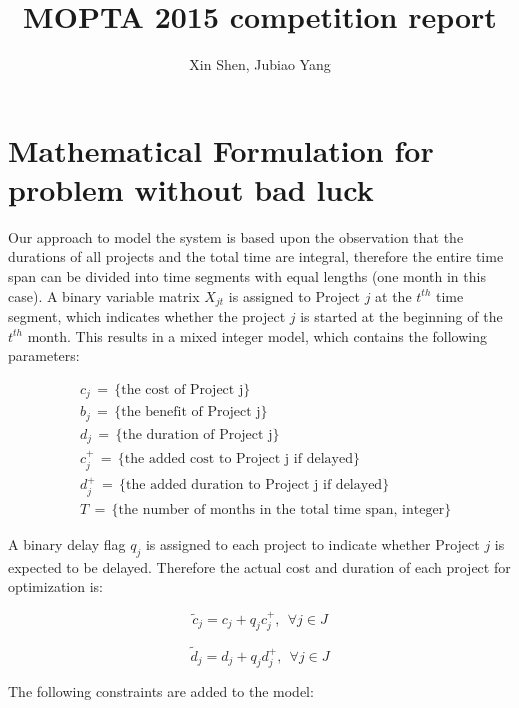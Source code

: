 \documentclass[final,3p,times]{elsarticle}
\begin{document}
\begin{frontmatter}

\title{MOPTA 2015 competition report}

\author{Xin Shen, Jubiao Yang}
\end{frontmatter}

\section{Mathematical Formulation for problem without bad luck}
Our approach to model the system is based upon the observation that the durations of all projects and the total time are integral, therefore the entire time span can be divided into time segments with equal lengths (one month in this case). A binary variable matrix $X_{jt}$ is assigned to Project $j$ at the $t^{th}$ time segment, which indicates whether the project $j$ is started at the beginning of the $t^{th}$ month. This results in a mixed integer model, which contains the following parameters:

\begin{align*}
&c_j\,=\, \{\mbox{the cost of Project j}\}\\
&b_j\,=\, \{\mbox{the benefit of Project j}\}\\
&d_j\,=\, \{\mbox{the duration of Project j}\}\\
&c^+_j\,=\, \{\mbox{the added cost to Project j if delayed}\}\\
&d^+_j\,=\, \{\mbox{the added duration to Project j if delayed}\}\\
&T \,=\, \{\mbox{the number of months in the total time span, integer}\}
\end{align*}

A binary delay flag $q_j$ is assigned to each project to indicate whether Project $j$ is expected to be delayed. Therefore the actual cost and duration of each project for optimization is:

\begin{equation}
	\tilde{c}_j = c_j + q_j c^+_j,~~\forall j \in J
\end{equation}

\begin{equation}
	\tilde{d}_j = d_j + q_j d^+_j,~~\forall j \in J
\end{equation}

The following constraints are added to the model:
\end{document}
